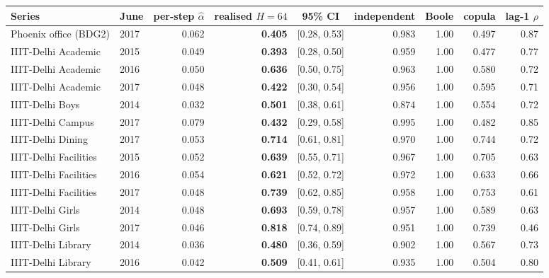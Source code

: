 \begin{table}[t]
\centering
\scriptsize
\setlength{\tabcolsep}{3pt}
\begin{tabular}{llrrcrrrr}
\toprule
Series & June & per-step $\hat\alpha$ & realised $H{=}64$ & 95\% CI & independent & Boole & copula & lag-1 $\rho$ \\
\midrule
Phoenix office (BDG2) & 2017 & 0.062 & \textbf{0.405} & [0.28, 0.53] & 0.983 & 1.00 & 0.497 & 0.87 \\
\midrule
IIIT-Delhi Academic & 2015 & 0.049 & \textbf{0.393} & [0.28, 0.50] & 0.959 & 1.00 & 0.477 & 0.77 \\
IIIT-Delhi Academic & 2016 & 0.050 & \textbf{0.636} & [0.50, 0.75] & 0.963 & 1.00 & 0.580 & 0.72 \\
IIIT-Delhi Academic & 2017 & 0.048 & \textbf{0.422} & [0.30, 0.54] & 0.956 & 1.00 & 0.595 & 0.71 \\
IIIT-Delhi Boys & 2014 & 0.032 & \textbf{0.501} & [0.38, 0.61] & 0.874 & 1.00 & 0.554 & 0.72 \\
IIIT-Delhi Campus & 2017 & 0.079 & \textbf{0.432} & [0.29, 0.58] & 0.995 & 1.00 & 0.482 & 0.85 \\
IIIT-Delhi Dining & 2017 & 0.053 & \textbf{0.714} & [0.61, 0.81] & 0.970 & 1.00 & 0.744 & 0.72 \\
IIIT-Delhi Facilities & 2015 & 0.052 & \textbf{0.639} & [0.55, 0.71] & 0.967 & 1.00 & 0.705 & 0.63 \\
IIIT-Delhi Facilities & 2016 & 0.054 & \textbf{0.621} & [0.52, 0.72] & 0.972 & 1.00 & 0.633 & 0.66 \\
IIIT-Delhi Facilities & 2017 & 0.048 & \textbf{0.739} & [0.62, 0.85] & 0.958 & 1.00 & 0.753 & 0.61 \\
IIIT-Delhi Girls & 2014 & 0.048 & \textbf{0.693} & [0.59, 0.78] & 0.957 & 1.00 & 0.589 & 0.63 \\
IIIT-Delhi Girls & 2017 & 0.046 & \textbf{0.818} & [0.74, 0.89] & 0.951 & 1.00 & 0.739 & 0.46 \\
IIIT-Delhi Library & 2014 & 0.036 & \textbf{0.480} & [0.36, 0.59] & 0.902 & 1.00 & 0.567 & 0.73 \\
IIIT-Delhi Library & 2016 & 0.042 & \textbf{0.509} & [0.41, 0.61] & 0.935 & 1.00 & 0.504 & 0.80 \\
\bottomrule
\end{tabular}

\end{table}
